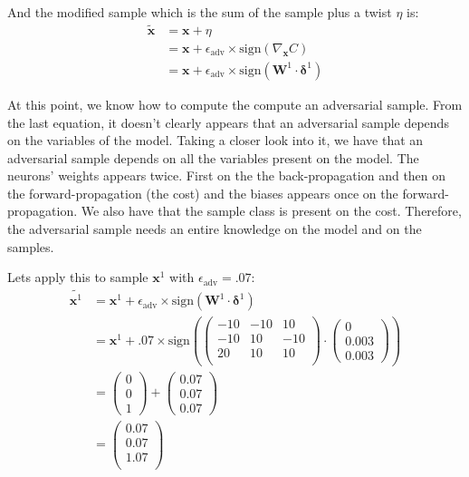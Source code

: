 		And the modified sample which is the sum of the sample plus a twist $\eta$ is:
		\begin{equation}
			\begin{split}
				\tilde{\boldsymbol{x}}
				&= \boldsymbol{x} + \eta \\
				&= \boldsymbol{x} + \epsilon_{\text{adv}} \times \text{sign}(\nabla_{\boldsymbol{x}} C) \\
				&= \boldsymbol{x} + \epsilon_{\text{adv}} \times \text{sign}( \boldsymbol{W}^1 \cdot \boldsymbol{\delta}^1 )
			\end{split}
			\label{eq:sample_twist}
		\end{equation}

		At this point, we know how to compute the compute an adversarial sample. From the last equation, it doesn't clearly appears that an adversarial sample depends on the variables of the model. Taking a closer look into it, we have that an adversarial sample depends on all the variables present on the model. The neurons' weights appears twice. First on the the back-propagation and then on the forward-propagation (the cost) and the biases appears once on the forward-propagation. We also have that the sample class is present on the cost. Therefore, the adversarial sample needs an entire knowledge on the model and on the samples.

		\vskip 1cm
		Lets apply this to sample $\boldsymbol{x}^1$ with $\epsilon_{\text{adv}} = .07$:
		\begin{equation}
			\begin{split}
				\widetilde{\boldsymbol{x}^1}
				&= \boldsymbol{x}^1 + \epsilon_{\text{adv}} \times \text{sign}( \boldsymbol{W}^1 \cdot \boldsymbol{\delta}^1 ) \\
				&= \boldsymbol{x}^1 + .07 \times \text{sign}
				\left( \left( \begin{matrix}
				-10 	& -10 	& 10 \\
				-10 	& 10 	& -10 \\
				20 		& 10 	& 10 \\
				\end{matrix} \right) \cdot
				\left( \begin{matrix}0 \\ 0.003 \\0.003  \end{matrix} \right) \right)\\
				&= \left( \begin{matrix} 0 \\   0 \\ 1  \end{matrix} \right) +
				\left( \begin{matrix}0.07 \\0.07 \\0.07 \end{matrix} \right) \\
				&= \left( \begin{matrix}0.07 \\0.07 \\1.07 \\\end{matrix} \right)
			\end{split}
		\end{equation}

